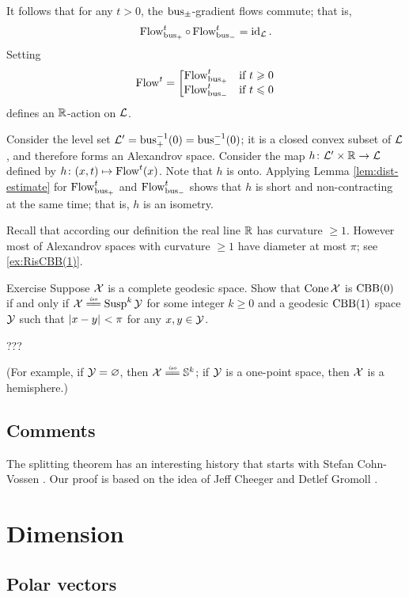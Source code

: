 It follows that for any $t>0$, the $\operatorname{\rm bus}\nolimits_\pm$-gradient flows commute;
that is, 
\[\mathop{\rm Flow}\nolimits_{\operatorname{\rm bus}\nolimits_+}^t\circ\mathop{\rm Flow}\nolimits_{\operatorname{\rm bus}\nolimits_-}^t=\operatorname{\rm id}\nolimits_{\mathcal{L}}.\]
Setting
\[\mathop{\rm Flow}\nolimits^t=\left[\begin{matrix}
\mathop{\rm Flow}\nolimits_{\operatorname{\rm bus}\nolimits_+}^t&\hbox{if}\ t\geqslant0\\
\mathop{\rm Flow}\nolimits_{\operatorname{\rm bus}\nolimits_-}^t&\hbox{if}\ t\leqslant0
               \end{matrix}\right.\]
defines an $\mathbb{R}$-action on $\mathcal{L}$.

Consider the level set $\mathcal{L}'=\operatorname{\rm bus}\nolimits_+^{-1}(0)=\operatorname{\rm bus}\nolimits_-^{-1}(0)$;
it is a closed convex subset of $\mathcal{L}$, and therefore forms an Alexandrov space.
Consider the map $h\colon\mathcal{L}'\times \mathbb{R}\to \mathcal{L}$ defined by $h\colon(x,t)\mapsto \mathop{\rm Flow}\nolimits^t(x)$.
Note that $h$ is onto.
Applying Lemma \ref{lem:dist-estimate} for $\mathop{\rm Flow}\nolimits_{\operatorname{\rm bus}\nolimits_+}^t$ and $\mathop{\rm Flow}\nolimits_{\operatorname{\rm bus}\nolimits_-}^t$ shows that $h$ is short and non-contracting at the same time; that is, $h$ is an isometry.
\qeds

Recall that according our definition the real line $\mathbb{R}$ has curvature $\ge 1$.
However most of Alexandrov spaces with curvature $\ge 1$ have diameter at most $\pi$;
see \ref{ex:RisCBB(1)}.

\begin{thm}{Exercise}\label{ex:cone-CBB}
Suppose $\mathcal{X}$ is a complete geodesic space.
Show that $\mathop{\rm Cone}\nolimits\mathcal{X}$ is $\mathrm{CBB}(0)$ if and only if $\spc{X}\iso\Susp^k\spc{Y}$
for some integer $k\ge 0$ and a geodesic $\mathrm{CBB}(1)$ space $\mathcal{Y}$ such that $\dist{x}{y}{}<\pi$ for any $x,y\in\mathcal{Y}$.

???

(For example, if $\mathcal{Y}=\varnothing$, then $\spc{X}\iso \mathbb{S}^k$;
if $\mathcal{Y}$ is a one-point space, then $\mathcal{X}$ is a hemisphere.)
\end{thm}

\section{Comments}

The splitting theorem has an interesting history that starts with Stefan Cohn-Vossen \cite{cohn-vossen_line}.
Our proof is based on the idea of Jeff Cheeger and Detlef Gromoll \cite{cheeger-gromoll-split}.

\chapter{Dimension}\label{chap:dim}

\section{Polar vectors}

